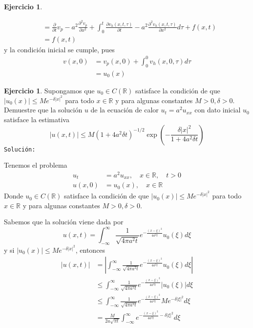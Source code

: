 \documentclass{article}
\theoremstyle{plain}
\theoremstyle{definition}
\newtheorem{ex}[proposición]{Ejercicio}
\begin{document}
\begin{ex}
\begin{enumerate}
\begin{align*}
                &= \frac{\partial}{\partial t} v_{p} - a^2\frac{\partial^2 v_{p}}{\partial x^2} + \int_0^t \frac{\partial v_h(x,t,\tau)}{\partial t} -a^2\frac{\partial^2 v_{h}(x,t, \tau)}{\partial x^2} d\tau + f(x,t)\\
                &= f(x,t)
            \end{align*}
            y la condición inicial se cumple, pues
            \begin{align*}
                v(x,0) &= v_{p}(x,0) + \int_0^0 v_{h}(x,0,\tau) d\tau \\
                &= u_0(x)
            \end{align*}
    \end{enumerate}
\end{ex}

\newpage
\begin{ex}
     Supongamos que \( u_0 \in C(\mathbb{R}) \) satisface la condición de que \( |u_0(x)| \leq M e^{-\delta|x|^{2}} \) para todo \( x \in \mathbb{R} \) y para algunas constantes \( M > 0, \delta > 0 \). Demuestre que la solución \( u \) de la ecuación de calor \( u_t = a^2 u_{xx} \) con dato inicial \( u_0 \) satisface la estimativa
\[
|u(x, t)| \leq M(1 + 4a^2 \delta t)^{-1/2} \exp \left( -\frac{\delta |x|^2}{1 + 4a^2 \delta t} \right)
\]
\texttt{Solución:}

Tenemos el problema
\begin{align*}
    u_t &= a^2 u_{xx}, \quad x \in \mathbb{R}, \quad t > 0\\
    u(x, 0) &= u_0(x), \quad x \in \mathbb{R}
\end{align*}
Donde \(u_0 \in C(\mathbb{R})\) satisface la condición de que \( |u_0(x)| \leq M e^{-\delta|x|^{2}} \) para todo \( x \in \mathbb{R} \) y para algunas constantes \( M > 0, \delta > 0 \).

Sabemos que la solución viene dada por
\[
    u(x,t) = \int_{-\infty}^{\infty} \frac{1}{\sqrt{4 \pi a^2 t}} e^{-\frac{(x - \xi)^2}{4a^2 t}} u_0(\xi) d\xi
\]
y si \(|u_0(x)| \leq M e^{-\delta|x|^{2}}\), entonces
\begin{align*}
    |u(x,t)| &= \left| \int_{-\infty}^{\infty} \frac{1}{\sqrt{4 \pi a^2 t}} e^{-\frac{(x - \xi)^2}{4a^2 t}} u_0(\xi) d\xi \right| \\
    &\leq \int_{-\infty}^{\infty} \frac{1}{\sqrt{4 \pi a^2 t}} e^{-\frac{(x - \xi)^2}{4a^2 t}} |u_0(\xi)| d\xi \\
    &\leq \int_{-\infty}^{\infty} \frac{1}{\sqrt{4 \pi a^2 t}} e^{-\frac{(x - \xi)^2}{4a^2 t}} M e^{-\delta|\xi|^{2}} d\xi \\
    &= \frac{M}{2a\sqrt{\pi t}} \int_{-\infty}^{\infty} e^{-\frac{(x - \xi)^2}{4a^2 t} -\delta|\xi|^{2}} d\xi\\
\end{align*}


\end{ex}
\end{document}
